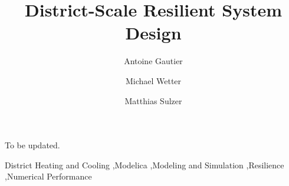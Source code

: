 \begin{frontmatter}



\title{District-Scale Resilient System Design}

%
\author[lbl]{Antoine Gautier}%
\author[lbl]{Michael Wetter}%
\author[empa]{Matthias Sulzer}%
%


\begin{abstract}

\end{abstract}

\begin{highlights}

\item To be updated.

\end{highlights}

\begin{keyword}
District Heating and Cooling \sep Modelica \sep Modeling and Simulation \sep Resilience \sep Numerical Performance
\end{keyword}

\end{frontmatter}